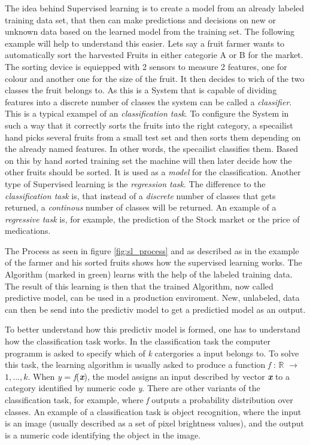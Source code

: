 \documentclass[12pt,oneside,a4paper,parskip]{scrbook}
\newcommand{\R}{\mathbb{R}}
\begin{document}
The idea behind Supervised learning is to create a model from an already labeled training data set, that then can make 
predictions and decisions on new or unknown data based on the learned model from the training set. 
The following example will help to understand this easier.
Lets say a fruit farmer wants to automatically sort the harvested Fruits in either categorie A or B for the market. 
The sorting device is equiepped with 2 sensors to measure 2 features, one for colour and another one for the size of the 
fruit. It then decides to wich of the two classes the fruit belongs to. As this is a System that is capable of dividing 
features into a discrete number of classes the system can be called a \textit{classifier}. 
This is a typical exampel of an \textit{classification task}.
To configure the System in such a way that it correctly sorts the fruits into the right category, 
a specailist hand picks several fruits from a small test set and then sorts them depending on the already named features. 
In other words, the specailist classifies them. Based on this by hand sorted training set the machine will then later 
decide how the other fruits should be sorted. It is used as a \textit{model} for the classification. \cite{IntroAI}
Another type of Supervised learning is the \textit{regression task}. The difference to the \textit{classification task} is, 
that instead of a \textit{discrete} number of classes that gets returned, a \textit{continous} number of classes will be 
returned. An example of a \textit{regressive task} is, for example, the prediction of the Stock market or the price of 
medications.

The Process as seen in figure \ref{fig:sl_process} and as described as in the example of the farmer and his sorted 
fruits shows how the supervised learning works. The Algorithm (marked in green) learns with the help of the labeled 
training data. The result of this learning is then that the trained Algorithm, now called predictive model, 
can be used in a production enviroment.
New, unlabeled, data can then be send into the predictiv model to get a predictied model as an output. \cite{PythonML}

To better understand how this predictiv model is formed, one has to understand how the classification task works. 
In the classification task the computer programm is asked to specify which of \textit{k} catergories a input belongs to. 
To solve this task, the learning algorithm is usually asked to produce a function \textit{f} : $\R{}$ $\rightarrow$ ${1,...,k}$. 
When \textit{y} = \textit{f}(\textit{\textbf{x}}), the model assigns an input described by vector \textit{\textbf{x}} to a 
category identiﬁed by numeric code \textit{y}.
There are other variants of the classiﬁcation task, for example, where \textit{f} outputs a probability distribution over 
classes. An example of a classiﬁcation task is object recognition, where the input is an image (usually described as a set 
of pixel brightness values), and the output is a numeric code identifying the object in the image. \cite{Goodfellow-et-al-2016}
\end{document}
